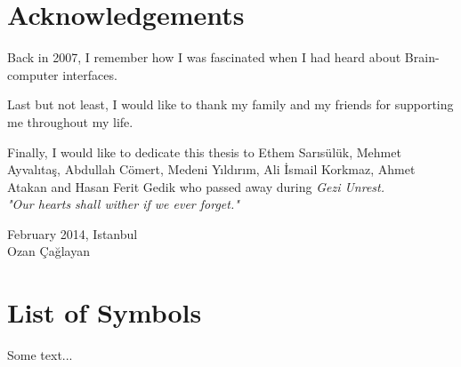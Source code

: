 \documentclass[12pt]{article}
\title{}
\numberwithin{equation}{section}
\numberwithin{figure}{section}
\numberwithin{table}{section}
\begin{document}
%



\clearpage
\vspace*{-0.35cm}
\section*{Acknowledgements}
\vspace*{6pt}
\par{
Back in 2007, I remember how I was fascinated when I had heard about Brain-computer interfaces.
}
\par{
Last but not least, I would like to thank my family and my friends for supporting me throughout my life.
}
\par{
Finally, I would like to dedicate this thesis to Ethem Sarısülük, Mehmet Ayvalıtaş, Abdullah Cömert, Medeni Yıldırım, Ali İsmail Korkmaz,
Ahmet Atakan and Hasan Ferit Gedik who passed away during \em{Gezi Unrest}.\\
"Our hearts shall wither if we ever forget."
}

\vspace*{2cm}
\begin{flushright}
February 2014, Istanbul \\
Ozan Çağlayan
\end{flushright}
\clearpage

\setcounter{tocdepth}{5}
\renewcommand\contentsname{\normalsize\bfseries Table of Contents}
\thispagestyle{empty}
\vspace*{0.15cm}
\tableofcontents
\clearpage

\vspace*{-0.35cm}
\thispagestyle{empty}
\section*{List of Symbols}
Some text...
\vspace*{6pt}
\clearpage

\renewcommand\listfigurename{\normalsize\bfseries List of Figures}
\thispagestyle{empty}
\vspace*{0.15cm}
\listoffigures
\clearpage
\end{document}
